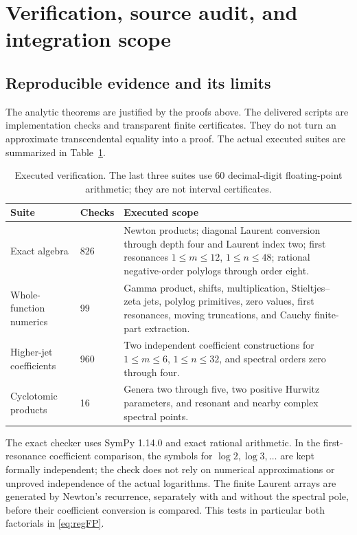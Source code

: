 \documentclass[11pt]{article}
\numberwithin{equation}{section}
\theoremstyle{definition}\newtheorem{definition}[theorem]{Definition}
\theoremstyle{remark}\newtheorem{remark}[theorem]{Remark}
\begin{document}
\section{Verification, source audit, and integration scope}
\label{sec:audit}
\subsection{Reproducible evidence and its limits}
The analytic theorems are justified by the proofs above. The delivered
scripts are implementation checks and transparent finite certificates.
They do not turn an approximate transcendental equality into a proof.
The actual executed suites are summarized in Table~\ref{tab:verification}.

\begin{table}[htbp]
\centering\small
\begin{tabular}{@{}p{}p{}p{}@{}}
\toprule
Suite & Checks & Executed scope\\
\midrule
Exact algebra & 826 & Newton products; diagonal Laurent conversion through depth four and Laurent index two; first resonances $1\le m\le12$, $1\le n\le48$; rational negative-order polylogs through order eight.\\[3pt]
Whole-function numerics & 99 & Gamma product, shifts, multiplication, Stieltjes--zeta jets, polylog primitives, zero values, first resonances, moving truncations, and Cauchy finite-part extraction.\\[3pt]
Higher-jet coefficients & 960 & Two independent coefficient constructions for $1\le m\le6$, $1\le n\le32$, and spectral orders zero through four.\\[3pt]
Cyclotomic products & 16 & Genera two through five, two positive Hurwitz parameters, and resonant and nearby complex spectral points.\\
\bottomrule
\end{tabular}
\caption{Executed verification. The last three suites use 60 decimal-digit
floating-point arithmetic; they are not interval certificates.}
\label{tab:verification}
\end{table}

The exact checker uses SymPy 1.14.0 and exact rational arithmetic. In the
first-resonance coefficient comparison, the symbols for $\log2,\log3,\ldots$
are kept formally independent; the check does not rely on numerical
approximations or unproved independence of the actual logarithms.
The finite Laurent arrays are generated by Newton's recurrence, separately
with and without the spectral pole, before their coefficient conversion is
compared. This tests in particular both factorials in \eqref{eq:regFP}.
\end{document}
